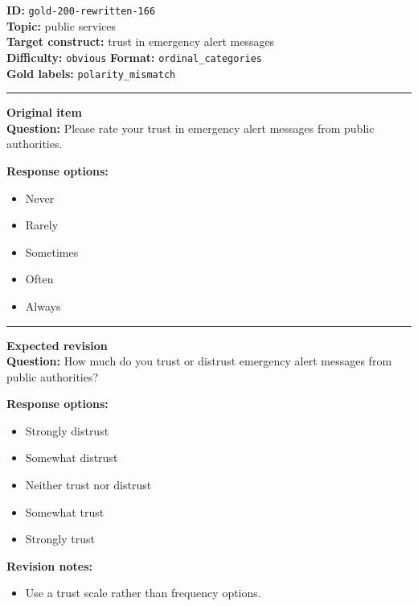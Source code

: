 \documentclass[10pt,a4paper]{article}
\newcommand{\sectionline}{\vspace{0.15em}\hrule\vspace{0.35em}}
\begin{document}
\begin{tcolorbox}[colframe=FlawRed,colback=white,colbacktitle=FlawRed!9,coltitle=black,title={Item 166\hfill Flawed item}]
\textbf{ID:} \texttt{gold-200-rewritten-166}\\
\textbf{Topic:} public services\\
\textbf{Target construct:} trust in emergency alert messages\\
\textbf{Difficulty:} \texttt{obvious} \quad \textbf{Format:} \texttt{ordinal\_categories}\\
\textbf{Gold labels:} \texttt{polarity\_mismatch}\\
\sectionline
\textbf{Original item}\\
\textbf{Question:} Please rate your trust in emergency alert messages from public authorities.
\par\textbf{Response options:}
\begin{itemize}
\item Never
\item Rarely
\item Sometimes
\item Often
\item Always
\end{itemize}
\sectionline
\textbf{Expected revision}\\
\textbf{Question:} How much do you trust or distrust emergency alert messages from public authorities?
\par\textbf{Response options:}
\begin{itemize}
\item Strongly distrust
\item Somewhat distrust
\item Neither trust nor distrust
\item Somewhat trust
\item Strongly trust
\end{itemize}
\par\textbf{Revision notes:}
\begin{itemize}
\item Use a trust scale rather than frequency options.
\end{itemize}
\end{tcolorbox}
\end{document}
